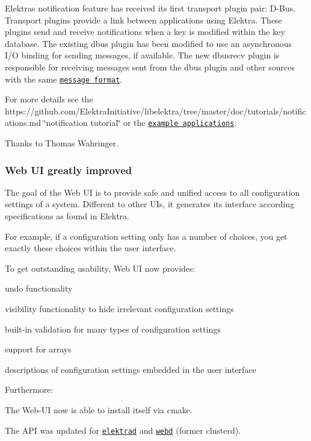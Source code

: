 Elektra\textquotesingle{}s notification feature has received its first transport plugin pair\+: D-\/\+Bus. Transport plugins provide a link between applications using Elektra. These plugins send and receive notifications when a key is modified within the key database. The existing {\ttfamily dbus} plugin has been modified to use an asynchronous I/O binding for sending messages, if available. The new {\ttfamily dbusrecv} plugin is responsible for receiving messages sent from the {\ttfamily dbus} plugin and other sources with the same \href{https://www.libelektra.org/plugins/dbus#notification-format}{\tt message format}.

For more details see the https\+://github.com/\+Elektra\+Initiative/libelektra/tree/master/doc/tutorials/notifications.\+md \char`\"{}notification tutorial\char`\"{} or the \href{https://github.com/ElektraInitiative/libelektra/tree/master/src/libs/notification/example}{\tt example applications}.

Thanks to Thomas Wahringer.

\subsubsection*{Web UI greatly improved}

The goal of the Web UI is to provide safe and unified access to all configuration settings of a system. Different to other U\+Is, it generates its interface according specifications as found in Elektra.

For example, if a configuration setting only has a number of choices, you get exactly these choices within the user interface.

To get outstanding usability, Web UI now provides\+:


\begin{DoxyItemize}
\item undo functionality
\item visibility functionality to hide irrelevant configuration settings
\item built-\/in validation for many types of configuration settings
\item support for arrays
\item descriptions of configuration settings embedded in the user interface
\end{DoxyItemize}

Furthermore\+:


\begin{DoxyItemize}
\item The Web-\/\+UI now is able to install itself via cmake.
\item The A\+PI was updated for \href{https://master.libelektra.org/doc/api_blueprints/elektrad.apib}{\tt elektrad} and \href{https://master.libelektra.org/doc/api_blueprints/webd.apib}{\tt webd} (former clusterd).
\end{DoxyItemize}

